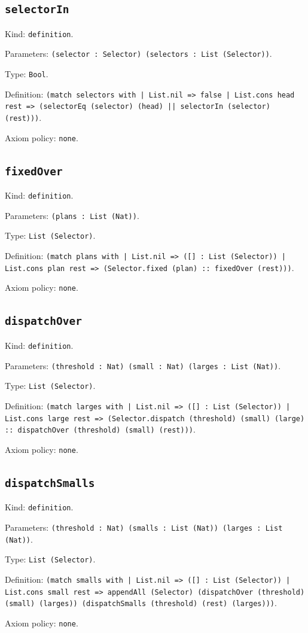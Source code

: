 \documentclass[11pt]{article}
\begin{document}
\subsection*{\texttt{selectorIn}}
\noindent Kind: \texttt{definition}.\par
\noindent Parameters: \texttt{(selector : Selector) (selectors : List (Selector))}.\par
\noindent Type: \texttt{Bool}.\par
\noindent Definition: \texttt{(match selectors with | List.nil => false | List.cons head rest => (selectorEq (selector) (head) || selectorIn (selector) (rest)))}.\par
\noindent Axiom policy: \texttt{none}.\par
\subsection*{\texttt{fixedOver}}
\noindent Kind: \texttt{definition}.\par
\noindent Parameters: \texttt{(plans : List (Nat))}.\par
\noindent Type: \texttt{List (Selector)}.\par
\noindent Definition: \texttt{(match plans with | List.nil => ([] : List (Selector)) | List.cons plan rest => (Selector.fixed (plan) :: fixedOver (rest)))}.\par
\noindent Axiom policy: \texttt{none}.\par
\subsection*{\texttt{dispatchOver}}
\noindent Kind: \texttt{definition}.\par
\noindent Parameters: \texttt{(threshold : Nat) (small : Nat) (larges : List (Nat))}.\par
\noindent Type: \texttt{List (Selector)}.\par
\noindent Definition: \texttt{(match larges with | List.nil => ([] : List (Selector)) | List.cons large rest => (Selector.dispatch (threshold) (small) (large) :: dispatchOver (threshold) (small) (rest)))}.\par
\noindent Axiom policy: \texttt{none}.\par
\subsection*{\texttt{dispatchSmalls}}
\noindent Kind: \texttt{definition}.\par
\noindent Parameters: \texttt{(threshold : Nat) (smalls : List (Nat)) (larges : List (Nat))}.\par
\noindent Type: \texttt{List (Selector)}.\par
\noindent Definition: \texttt{(match smalls with | List.nil => ([] : List (Selector)) | List.cons small rest => appendAll (Selector) (dispatchOver (threshold) (small) (larges)) (dispatchSmalls (threshold) (rest) (larges)))}.\par
\noindent Axiom policy: \texttt{none}.\par
\end{document}
